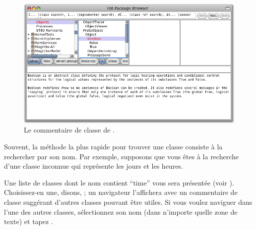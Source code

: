 \documentclass[a4paper,10pt,twoside]{book}
\begin{document}
\begin{figure}[hbt]
\centerline {\includegraphics[width=\textwidth]{classComment}}
\caption{Le commentaire de classe de .
}
\end{figure}

Souvent, la méthode la plus rapide pour trouver une classe consiste
à la rechercher par son nom. Par exemple, supposons que vous êtes
à la recherche d'une classe inconnue qui représente les jours et
les heures.%

\noindent
Une liste de classes dont le nom contient ``time'' vous sera
présentée (voir ). Choisissez-en une, disons,
; 
un navigateur l'affichera avec un commentaire de classe
suggérant d'autres classes pouvant être utiles. Si vous voulez
naviguer dans l'une des autres classes, sélectionnez son nom (dans
n'importe quelle zone de texte) et tapez .
\end{document}
